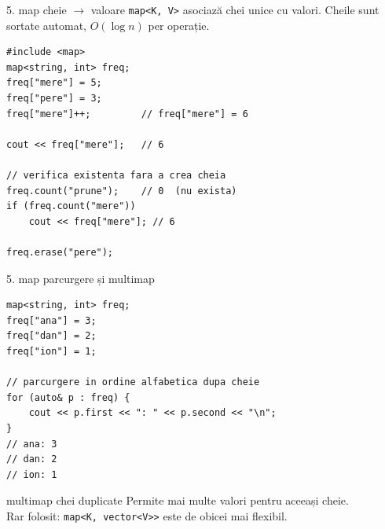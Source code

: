 ﻿\documentclass{beamer}
\begin{document}
\begin{frame}[fragile]{5. map \textemdash{} cheie $\rightarrow$ valoare}
  \texttt{map<K,\,V>} asociază chei unice cu valori.
  Cheile sunt sortate automat, $O(\log n)$ per operație.

  \begin{lstlisting}
#include <map>
map<string, int> freq;
freq["mere"] = 5;
freq["pere"] = 3;
freq["mere"]++;         // freq["mere"] = 6

cout << freq["mere"];   // 6

// verifica existenta fara a crea cheia
freq.count("prune");    // 0  (nu exista)
if (freq.count("mere"))
    cout << freq["mere"]; // 6

freq.erase("pere");
  \end{lstlisting}
\end{frame}

\begin{frame}[fragile]{5. map \textemdash{} parcurgere și multimap}
  \begin{lstlisting}
map<string, int> freq;
freq["ana"] = 3;
freq["dan"] = 2;
freq["ion"] = 1;

// parcurgere in ordine alfabetica dupa cheie
for (auto& p : freq) {
    cout << p.first << ": " << p.second << "\n";
}
// ana: 3
// dan: 2
// ion: 1
  \end{lstlisting}

  \begin{block}{multimap \textemdash{} chei duplicate}
    Permite mai multe valori pentru aceeași cheie. \\
    Rar folosit: \texttt{map<K,\,vector<V>>} este de obicei mai flexibil.
  \end{block}
\end{frame}
\end{document}
